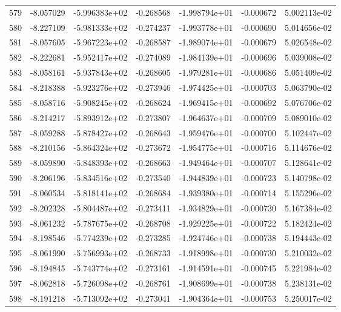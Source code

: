 \begin{tabular}{rrrrrrr}
 579 &  -8.057029 & -5.996383e+02 & -0.268568 & -1.998794e+01 &   -0.000672 &  5.002113e-02 \\
 580 &  -8.227109 & -5.981333e+02 & -0.274237 & -1.993778e+01 &   -0.000690 &  5.014656e-02 \\
 581 &  -8.057605 & -5.967223e+02 & -0.268587 & -1.989074e+01 &   -0.000679 &  5.026548e-02 \\
 582 &  -8.222681 & -5.952417e+02 & -0.274089 & -1.984139e+01 &   -0.000696 &  5.039008e-02 \\
 583 &  -8.058161 & -5.937843e+02 & -0.268605 & -1.979281e+01 &   -0.000686 &  5.051409e-02 \\
 584 &  -8.218388 & -5.923276e+02 & -0.273946 & -1.974425e+01 &   -0.000703 &  5.063790e-02 \\
 585 &  -8.058716 & -5.908245e+02 & -0.268624 & -1.969415e+01 &   -0.000692 &  5.076706e-02 \\
 586 &  -8.214217 & -5.893912e+02 & -0.273807 & -1.964637e+01 &   -0.000709 &  5.089010e-02 \\
 587 &  -8.059288 & -5.878427e+02 & -0.268643 & -1.959476e+01 &   -0.000700 &  5.102447e-02 \\
 588 &  -8.210156 & -5.864324e+02 & -0.273672 & -1.954775e+01 &   -0.000716 &  5.114676e-02 \\
 589 &  -8.059890 & -5.848393e+02 & -0.268663 & -1.949464e+01 &   -0.000707 &  5.128641e-02 \\
 590 &  -8.206196 & -5.834516e+02 & -0.273540 & -1.944839e+01 &   -0.000723 &  5.140798e-02 \\
 591 &  -8.060534 & -5.818141e+02 & -0.268684 & -1.939380e+01 &   -0.000714 &  5.155296e-02 \\
 592 &  -8.202328 & -5.804487e+02 & -0.273411 & -1.934829e+01 &   -0.000730 &  5.167384e-02 \\
 593 &  -8.061232 & -5.787675e+02 & -0.268708 & -1.929225e+01 &   -0.000722 &  5.182424e-02 \\
 594 &  -8.198546 & -5.774239e+02 & -0.273285 & -1.924746e+01 &   -0.000738 &  5.194443e-02 \\
 595 &  -8.061990 & -5.756993e+02 & -0.268733 & -1.918998e+01 &   -0.000730 &  5.210032e-02 \\
 596 &  -8.194845 & -5.743774e+02 & -0.273161 & -1.914591e+01 &   -0.000745 &  5.221984e-02 \\
 597 &  -8.062818 & -5.726098e+02 & -0.268761 & -1.908699e+01 &   -0.000738 &  5.238131e-02 \\
 598 &  -8.191218 & -5.713092e+02 & -0.273041 & -1.904364e+01 &   -0.000753 &  5.250017e-02 \\

\end{tabular}
